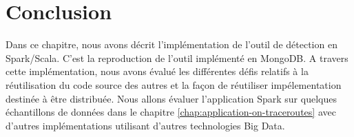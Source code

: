 \section{Conclusion}

Dans ce chapitre, nous avons décrit l'implémentation de l'outil de détection en Spark/Scala.  C'est la reproduction de l'outil implémenté en MongoDB. A travers cette implémentation, nous avons évalué les différentes défis relatifs à la réutilisation du code source des autres et la façon de réutiliser impélementation destinée à être distribuée. Nous allons évaluer l'application Spark sur quelques échantillons de données dans le chapitre \ref{chap:application-on-traceroutes} avec d'autres implémentations utilisant d'autres technologies Big Data. 